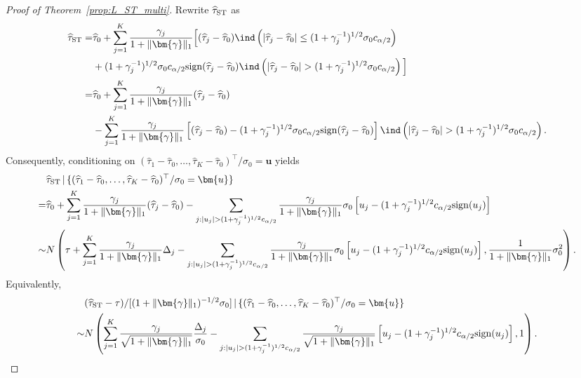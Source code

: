 \documentclass[11pt]{article}
\def\given{\,|\,}
\newcommand{\htau}{\widehat\tau}
\numberwithin{equation}{section}
\theoremstyle{definition}
\begin{document}
\begin{proof}[Proof of Theorem~\ref{prop:L_ST_multi}]
Rewrite $\htau_{\rm ST}$ as
\begin{align*}
  \htau_{\rm ST}=& \htau_0 + \sum_{j=1}^K \frac{\gamma_j}{1+\lVert \bm{\gamma} \rVert_1} \Big[(\htau_j - \htau_0) \ind\left(\lvert \htau_j - \htau_0 \rvert \le (1+\gamma_j^{-1})^{1/2}\sigma_0 c_{\alpha/2}\right) \\
  &+ (1+\gamma_j^{-1})^{1/2}\sigma_0 c_{\alpha/2} {\rm sign}(\htau_j - \htau_0) \ind\left(\lvert \htau_j - \htau_0 \rvert > (1+\gamma_j^{-1})^{1/2}\sigma_0 c_{\alpha/2}\right) \Big]\\
  =& \htau_0 + \sum_{j=1}^K \frac{\gamma_j}{1+\lVert \bm{\gamma} \rVert_1} (\htau_j - \htau_0) \\
  &- \sum_{j=1}^K \frac{\gamma_j}{1+\lVert \bm{\gamma} \rVert_1} \left[(\htau_j - \htau_0) - (1+\gamma_j^{-1})^{1/2}\sigma_0 c_{\alpha/2} {\rm sign}(\htau_j - \htau_0)\right] \ind\left(\lvert \htau_j - \htau_0 \rvert > (1+\gamma_j^{-1})^{1/2}\sigma_0 c_{\alpha/2}\right).
\end{align*}
Consequently, conditioning on $(\htau_1 - \htau_0, \ldots, \htau_K - \htau_0)^\top/\sigma_0=\bm{u}$ yields
\begin{align*}
  &\htau_{\rm ST} \given \{(\htau_1 - \htau_0, \ldots, \htau_K - \htau_0)^\top/\sigma_0 = \bm{u}\}\\
  =& \htau_0 + \sum_{j=1}^K \frac{\gamma_j}{1+\lVert \bm{\gamma} \rVert_1} (\htau_j - \htau_0) - \sum_{j: \lvert u_j \rvert > (1+\gamma_j^{-1})^{1/2} c_{\alpha/2}} \frac{\gamma_j}{1+\lVert \bm{\gamma} \rVert_1} \sigma_0 \left[u_j - (1+\gamma_j^{-1})^{1/2} c_{\alpha/2} {\rm sign}(u_j)\right]\\
  \sim& N\left(\tau + \sum_{j=1}^K \frac{\gamma_j}{1+\lVert \bm{\gamma} \rVert_1} \Delta_j - \sum_{j: \lvert u_j \rvert > (1+\gamma_j^{-1})^{1/2} c_{\alpha/2}} \frac{\gamma_j}{1+\lVert \bm{\gamma} \rVert_1} \sigma_0 \left[u_j - (1+\gamma_j^{-1})^{1/2} c_{\alpha/2} {\rm sign}(u_j)\right], \frac{1}{1+\lVert \bm{\gamma} \rVert_1} \sigma_0^2\right).
\end{align*}
Equivalently,
\begin{align*}
  &(\htau_{\rm ST} - \tau)/[(1+\lVert \bm{\gamma} \rVert_1)^{-1/2} \sigma_0] \given \{(\htau_1 - \htau_0, \ldots, \htau_K - \htau_0)^\top/\sigma_0 = \bm{u}\} \\
  \sim& N\left(\sum_{j=1}^K \frac{\gamma_j}{\sqrt{1+\lVert \bm{\gamma} \rVert_1}} \frac{\Delta_j}{\sigma_0} - \sum_{j: \lvert u_j \rvert > (1+\gamma_j^{-1})^{1/2} c_{\alpha/2}} \frac{\gamma_j}{\sqrt{1+\lVert \bm{\gamma} \rVert_1}} \left[u_j - (1+\gamma_j^{-1})^{1/2} c_{\alpha/2} {\rm sign}(u_j)\right], 1\right).
\end{align*}


\end{proof}
\end{document}
